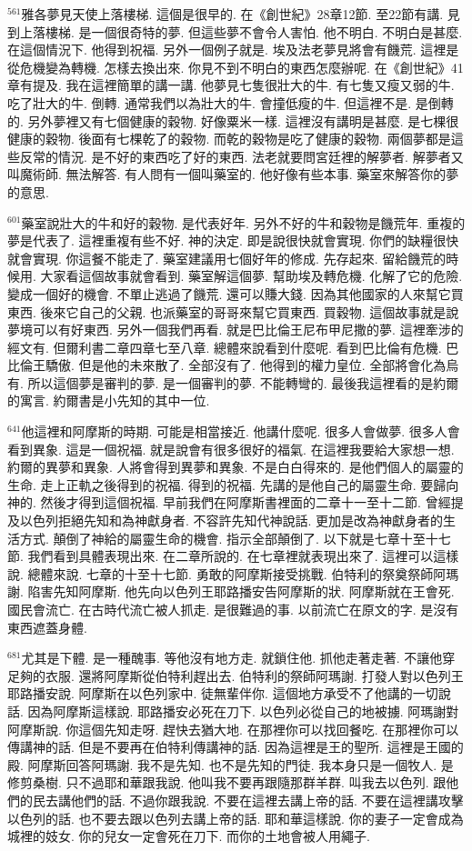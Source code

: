 \documentclass{book}
\begin{document}
$^{561}$雅各夢見天使上落樓梯.
這個是很早的.
在《創世紀》28章12節.
至22節有講.
見到上落樓梯.
是一個很奇特的夢.
但這些夢不會令人害怕.
他不明白.
不明白是甚麼.
在這個情況下.
他得到祝福.
另外一個例子就是.
埃及法老夢見將會有饑荒.
這裡是從危機變為轉機.
怎樣去換出來.
你見不到不明白的東西怎麼辦呢.
在《創世紀》41章有提及.
我在這裡簡單的講一講.
他夢見七隻很壯大的牛.
有七隻又瘦又弱的牛.
吃了壯大的牛.
倒轉.
通常我們以為壯大的牛.
會撞低瘦的牛.
但這裡不是.
是倒轉的.
另外夢裡又有七個健康的穀物.
好像粟米一樣.
這裡沒有講明是甚麼.
是七棵很健康的穀物.
後面有七棵乾了的穀物.
而乾的穀物是吃了健康的穀物.
兩個夢都是這些反常的情況.
是不好的東西吃了好的東西.
法老就要問宮廷裡的解夢者.
解夢者又叫魔術師.
無法解答.
有人問有一個叫藥室的.
他好像有些本事.
藥室來解答你的夢的意思.

$^{601}$藥室說壯大的牛和好的穀物.
是代表好年.
另外不好的牛和穀物是饑荒年.
重複的夢是代表了.
這裡重複有些不好.
神的決定.
即是說很快就會實現.
你們的缺糧很快就會實現.
你這餐不能走了.
藥室建議用七個好年的修成.
先存起來.
留給饑荒的時候用.
大家看這個故事就會看到.
藥室解這個夢.
幫助埃及轉危機.
化解了它的危險.
變成一個好的機會.
不單止逃過了饑荒.
還可以賺大錢.
因為其他國家的人來幫它買東西.
後來它自己的父親.
也派藥室的哥哥來幫它買東西.
買穀物.
這個故事就是說夢境可以有好東西.
另外一個我們再看.
就是巴比倫王尼布甲尼撒的夢.
這裡牽涉的經文有.
但爾利書二章四章七至八章.
總體來說看到什麼呢.
看到巴比倫有危機.
巴比倫王驕傲.
但是他的未來散了.
全部沒有了.
他得到的權力皇位.
全部將會化為烏有.
所以這個夢是審判的夢.
是一個審判的夢.
不能轉彎的.
最後我這裡看的是約爾的寓言.
約爾書是小先知的其中一位.

$^{641}$他這裡和阿摩斯的時期.
可能是相當接近.
他講什麼呢.
很多人會做夢.
很多人會看到異象.
這是一個祝福.
就是說會有很多很好的福氣.
在這裡我要給大家想一想.
約爾的異夢和異象.
人將會得到異夢和異象.
不是白白得來的.
是他們個人的屬靈的生命.
走上正軌之後得到的祝福.
得到的祝福.
先講的是他自己的屬靈生命.
要歸向神的.
然後才得到這個祝福.
早前我們在阿摩斯書裡面的二章十一至十二節.
曾經提及以色列拒絕先知和為神獻身者.
不容許先知代神說話.
更加是改為神獻身者的生活方式.
顛倒了神給的屬靈生命的機會.
指示全部顛倒了.
以下就是七章十至十七節.
我們看到具體表現出來.
在二章所說的.
在七章裡就表現出來了.
這裡可以這樣說.
總體來說.
七章的十至十七節.
勇敢的阿摩斯接受挑戰.
伯特利的祭奠祭師阿瑪謝.
陷害先知阿摩斯.
他先向以色列王耶路播安告阿摩斯的狀.
阿摩斯就在王會死.
國民會流亡.
在古時代流亡被人抓走.
是很難過的事.
以前流亡在原文的字.
是沒有東西遮蓋身體.

$^{681}$尤其是下體.
是一種醜事.
等他沒有地方走.
就鎖住他.
抓他走著走著.
不讓他穿足夠的衣服.
還將阿摩斯從伯特利趕出去.
伯特利的祭師阿瑪謝.
打發人對以色列王耶路播安說.
阿摩斯在以色列家中.
徒無輩伴你.
這個地方承受不了他講的一切說話.
因為阿摩斯這樣說.
耶路播安必死在刀下.
以色列必從自己的地被擄.
阿瑪謝對阿摩斯說.
你這個先知走呀.
趕快去猶大地.
在那裡你可以找回餐吃.
在那裡你可以傳講神的話.
但是不要再在伯特利傳講神的話.
因為這裡是王的聖所.
這裡是王國的殿.
阿摩斯回答阿瑪謝.
我不是先知.
也不是先知的門徒.
我本身只是一個牧人.
是修剪桑樹.
只不過耶和華跟我說.
他叫我不要再跟隨那群羊群.
叫我去以色列.
跟他們的民去講他們的話.
不過你跟我說.
不要在這裡去講上帝的話.
不要在這裡講攻擊以色列的話.
也不要去跟以色列去講上帝的話.
耶和華這樣說.
你的妻子一定會成為城裡的妓女.
你的兒女一定會死在刀下.
而你的土地會被人用繩子.
\end{document}
